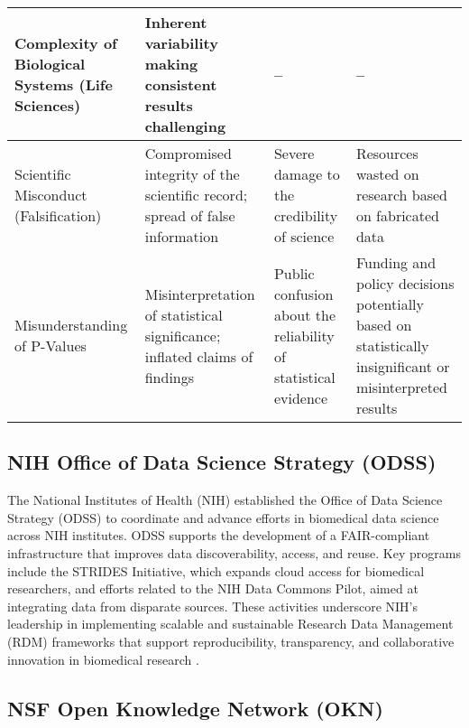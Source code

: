 \begin{table}[ht]
\begin{tabularx}{\textwidth}{|X|X|X|X|}
        \hline
        Complexity of Biological Systems (Life Sciences) & Inherent variability making consistent results challenging                      & --                                                                  & --                                                                                                      \\
        \hline
        Scientific Misconduct (Falsification)            & Compromised integrity of the scientific record; spread of false information     & Severe damage to the credibility of science                         & Resources wasted on research based on fabricated data                                                   \\
        \hline
        Misunderstanding of P-Values                     & Misinterpretation of statistical significance; inflated claims of findings      & Public confusion about the reliability of statistical evidence      & Funding and policy decisions potentially based on statistically insignificant or misinterpreted results \\
        \hline
    \end{tabularx}
\end{table}






\subsection{NIH Office of Data Science Strategy (ODSS)}

The National Institutes of Health (NIH) established the Office of Data Science Strategy (ODSS) to coordinate and advance efforts in biomedical data science across NIH institutes. ODSS supports the development of a FAIR-compliant infrastructure that improves data discoverability, access, and reuse. Key programs include the STRIDES Initiative, which expands cloud access for biomedical researchers, and efforts related to the NIH Data Commons Pilot, aimed at integrating data from disparate sources. These activities underscore NIH’s leadership in implementing scalable and sustainable Research Data Management (RDM) frameworks that support reproducibility, transparency, and collaborative innovation in biomedical research \cite{odss_nih}.

\subsection{NSF Open Knowledge Network (OKN)}

